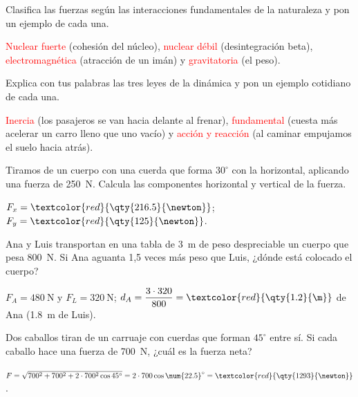 \begin{exercise}
    Clasifica las fuerzas según las interacciones fundamentales de la naturaleza y pon un ejemplo de cada una.
    \begin{solu}
        \textcolor{red}{Nuclear fuerte} (cohesión del núcleo), \textcolor{red}{nuclear débil} (desintegración beta),
        \textcolor{red}{electromagnética} (atracción de un imán) y \textcolor{red}{gravitatoria} (el peso).
    \end{solu}
\end{exercise}

\begin{exercise}
    Explica con tus palabras las tres leyes de la dinámica y pon un ejemplo cotidiano de cada una.
    \begin{solu}
        \textcolor{red}{Inercia} (los pasajeros se van hacia delante al frenar), \textcolor{red}{fundamental} (cuesta más acelerar un
        carro lleno que uno vacío) y \textcolor{red}{acción y reacción} (al caminar empujamos el suelo hacia atrás).
    \end{solu}
\end{exercise}

\begin{exercise}
    Tiramos de un cuerpo con una cuerda que forma \(30^\circ\) con la horizontal, aplicando una fuerza de \qty{250}{\newton}. Calcula
    las componentes horizontal y vertical de la fuerza.
    \begin{solu}
        \(F_x = \textcolor{red}{\qty{216.5}{\newton}}\); \(F_y = \textcolor{red}{\qty{125}{\newton}}\).
    \end{solu}
\end{exercise}

\begin{exercise}
    Ana y Luis transportan en una tabla de \qty{3}{\m} de peso despreciable un cuerpo que pesa \qty{800}{\newton}. Si Ana aguanta
    1,5 veces más peso que Luis, ¿dónde está colocado el cuerpo?
    \begin{solu}
        \(F_A = \qty{480}{\newton}\) y \(F_L = \qty{320}{\newton}\); \(d_A = \dfrac{3 \cdot 320}{800} = \textcolor{red}{\qty{1.2}{\m}}\)
        de Ana (\qty{1.8}{\m} de Luis).
    \end{solu}
\end{exercise}

\begin{exercise}
    Dos caballos tiran de un carruaje con cuerdas que forman \(45^\circ\) entre sí. Si cada caballo hace una fuerza de
    \qty{700}{\newton}, ¿cuál es la fuerza neta?
    \begin{solu}
        \(F = \sqrt{700^2 + 700^2 + 2 \cdot 700^2 \cos 45^\circ} = 2 \cdot 700\cos \num{22.5}^\circ = \textcolor{red}{\qty{1293}{\newton}}\).
    \end{solu}
\end{exercise}

